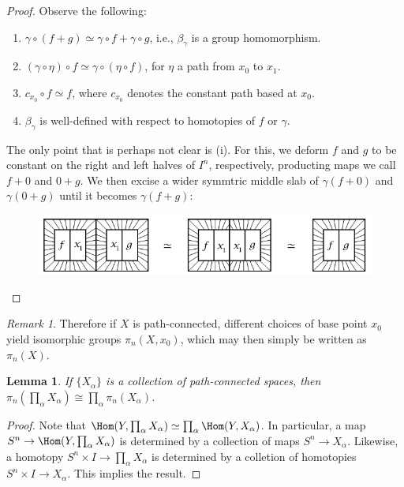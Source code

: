\documentclass[a4paper]{tufte-book}
\newtheorem{Lem}[equation]{Lemma}
\theoremstyle{remark}
\newtheorem{Rem}[equation]{Remark}
\begin{document}
\begin{proof}
	Observe the following:
	\begin{enumerate}
		\item $\gamma \circ (f + g) \simeq \gamma \circ f + \gamma \circ g$, i.e., $\beta_{\gamma}$ is a group homomorphism.
		\item $(\gamma \circ \eta) \circ f \simeq \gamma \circ (\eta \circ f)$, for $\eta$ a path from $x_0$ to $x_1$. 
		\item $c_{x_0} \circ f \simeq f$, where $c_{x_0}$ denotes the constant path based at $x_0$. 
		\item $\beta_{\gamma}$ is well-defined with respect to homotopies of $f$ or $\gamma$. 
	\end{enumerate}

	The only point that is perhaps not clear is (i). For this, we deform $f$ and $g$ to be constant on the right and left halves of $I^n$, respectively, producting maps we call $f+0$ and $0 + g$. We then excise a wider symmtric middle slab of $\gamma(f+0)$  and $\gamma(0+g)$ until it becomes $\gamma(f+g)$:
\begin{figure}[h] \centering\includegraphics[scale = 0.5]{path_invariance.png}\end{figure}
\end{proof}
\begin{Rem}
	Therefore if $X$ is path-connected, different choices of base point $x_0$ yield isomorphic groups $\pi_n(X,x_0)$, which may then simply be written as $\pi_n(X)$. 
\end{Rem}
\begin{Lem}
	If $\{ X_{\alpha} \}$ is a collection of path-connected spaces, then $\pi_n(\prod_{\alpha} X_{\alpha}) \cong \prod_{\alpha} \pi_n(X_{\alpha})$. 
\end{Lem}
\begin{proof}
	Note that $\Hom(Y,\prod_{\alpha} X_{\alpha}) \simeq \prod_{\alpha} \Hom(Y,X_{\alpha})$. In particular, a map $S^n \to \Hom(Y,\prod_{\alpha}X_{\alpha})$ is determined by a collection of maps $S^n \to X_{\alpha}$. Likewise, a homotopy $S^n \times I \to \prod_{\alpha} X_{\alpha}$ is determined by a colletion of homotopies $S^n \times I \to X_{\alpha}$. This implies the result. 
\end{proof}
\end{document}
